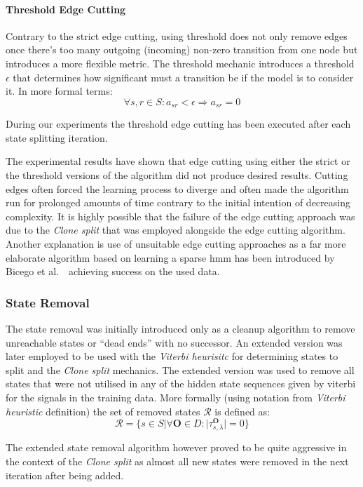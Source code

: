 \paragraph {Threshold Edge Cutting}
Contrary to the strict edge cutting, using threshold does not only remove edges once there's too many outgoing (incoming) non-zero transition from one node but introduces a more flexible metric. The threshold mechanic introduces a threshold $\epsilon$ that determines how significant must a transition be if the model is to consider it. In more formal terms:
$$\forall s,r\in S: a_{sr} < \epsilon \Rightarrow a_{sr} = 0$$

During our experiments the threshold edge cutting has been executed after each state splitting iteration. 

The experimental results have shown that edge cutting using either the strict or the threshold versions of the algorithm did not produce desired results. Cutting edges often forced the learning process to diverge and often made the algorithm run for prolonged amounts of time contrary to the initial intention of decreasing complexity. It is highly possible that the failure of the edge cutting approach was due to the \emph{Clone split} that was employed alongside the edge cutting algorithm. Another explanation is use of unsuitable edge cutting approaches as a far more elaborate algorithm based on learning a sparse \gls{hmm} has been introduced by Bicego et al.~\cite{bicego2007}~achieving success on the used data.

\subsubsection{State Removal}
The state removal was initially introduced only as a cleanup algorithm to remove unreachable states or ``dead ends'' with no successor. An extended version was later employed to be used with the \emph{Viterbi heurisitc} for determining states to split and the \emph{Clone split} mechanics. The extended version was used to remove all states that were not utilised in any of the hidden state sequences given by \gls{viterbi} for the signals in the training data. More formally (using notation from \emph{Viterbi heuristic} definition) the set of removed states $\mathcal{R}$ is defined as:
$$\mathcal{R}=\{s\in S|\forall\mathbf{O}\in D: |\tau_{s,\lambda}^\mathbf{O}|=0\}$$

The extended state removal algorithm however proved to be quite aggressive in the context of the \emph{Clone split} as almost all new states were removed in the next iteration after being added.

